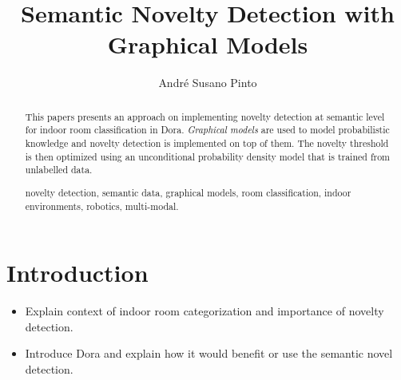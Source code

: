 \documentclass[runningheads,a4paper]{llncs}
\newcommand{\keywords}[1]{\par\addvspace\baselineskip
\noindent\keywordname\enspace\ignorespaces#1}
\begin{document}
\mainmatter  %

\title{Semantic Novelty Detection with Graphical Models}


%
%
\author{André Susano Pinto}
%


\maketitle


\begin{abstract}
This papers presents an approach on implementing novelty detection at semantic level
for indoor room classification in Dora. \emph{Graphical models} are used to model
probabilistic knowledge and novelty detection is implemented on top of them.
The novelty threshold is then optimized using an unconditional probability density
model that is trained from unlabelled data.

\keywords{novelty detection, semantic data, graphical models, room classification,
indoor environments, robotics, multi-modal.}
\end{abstract}


\section{Introduction}
\begin{itemize}
\item Explain context of indoor room categorization and importance of novelty detection.
\item Introduce Dora and explain how it would benefit or use the semantic novel detection.
\end{itemize}
\end{document}
